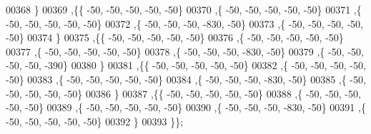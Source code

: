 \begin{DoxyCode}
00368   \}
00369  ,\{\{   -50,   -50,   -50,   -50,   -50\}
00370   ,\{   -50,   -50,   -50,   -50,   -50\}
00371   ,\{   -50,   -50,   -50,   -50,   -50\}
00372   ,\{   -50,   -50,   -50,  -830,   -50\}
00373   ,\{   -50,   -50,   -50,   -50,   -50\}
00374   \}
00375  ,\{\{   -50,   -50,   -50,   -50,   -50\}
00376   ,\{   -50,   -50,   -50,   -50,   -50\}
00377   ,\{   -50,   -50,   -50,   -50,   -50\}
00378   ,\{   -50,   -50,   -50,  -830,   -50\}
00379   ,\{   -50,   -50,   -50,   -50,  -390\}
00380   \}
00381  ,\{\{   -50,   -50,   -50,   -50,   -50\}
00382   ,\{   -50,   -50,   -50,   -50,   -50\}
00383   ,\{   -50,   -50,   -50,   -50,   -50\}
00384   ,\{   -50,   -50,   -50,  -830,   -50\}
00385   ,\{   -50,   -50,   -50,   -50,   -50\}
00386   \}
00387  ,\{\{   -50,   -50,   -50,   -50,   -50\}
00388   ,\{   -50,   -50,   -50,   -50,   -50\}
00389   ,\{   -50,   -50,   -50,   -50,   -50\}
00390   ,\{   -50,   -50,   -50,  -830,   -50\}
00391   ,\{   -50,   -50,   -50,   -50,   -50\}
00392   \}
00393  \}\};
\end{DoxyCode}
